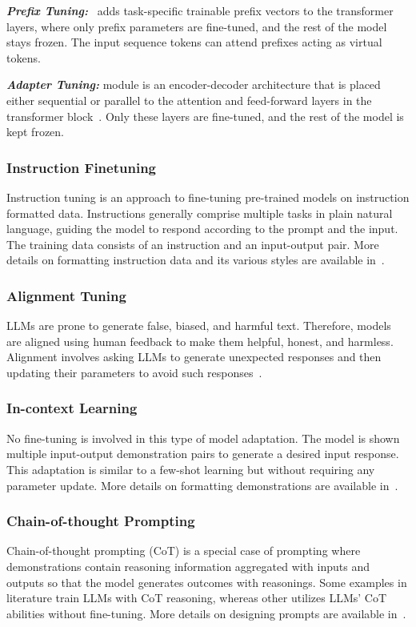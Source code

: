 \vspace{1mm}
\noindent
\emph{\textbf{Prefix Tuning:}}~\cite{Prefix_Tuning} adds task-specific trainable prefix vectors to the transformer layers, where only prefix parameters are fine-tuned, and the rest of the model stays frozen. The input sequence tokens can attend prefixes acting as virtual tokens.    

\vspace{1mm}
\noindent
\emph{\textbf{Adapter Tuning:}} module is an encoder-decoder architecture that is placed either sequential or parallel to the attention and feed-forward layers in the transformer block~\cite{LMAdapter, LMAdapter_2, LMAdapter_3}. Only these layers are fine-tuned, and the rest of the model is kept frozen.  

\subsubsection{Instruction Finetuning}
Instruction tuning is an approach to fine-tuning pre-trained models on instruction formatted data. Instructions generally comprise multiple tasks in plain natural language, guiding the model to respond according to the prompt and the input. The training data consists of an instruction and an input-output pair. More details on formatting instruction data and its various styles are available in~\cite{Survey_LLM}.     

\subsubsection{Alignment Tuning}
LLMs are prone to generate false, biased, and harmful text. Therefore, models are aligned using human feedback to make them helpful, honest, and harmless. Alignment involves asking LLMs to generate unexpected responses and then updating their parameters to avoid such responses~\cite{Survey_LLM}.

\subsubsection{In-context Learning} 
No fine-tuning is involved in this type of model adaptation. The model is shown multiple input-output demonstration pairs to generate a desired input response. This adaptation is similar to a few-shot learning but without requiring any parameter update. More details on formatting demonstrations are available in~\cite{Survey_LLM}. 
 
\subsubsection{Chain-of-thought Prompting}
Chain-of-thought prompting (CoT) is a special case of prompting where demonstrations contain reasoning information aggregated with inputs and outputs so that the model generates outcomes with reasonings. Some examples in literature train LLMs with CoT reasoning, whereas other utilizes LLMs' CoT abilities without fine-tuning. More details on designing prompts are available in~\cite{Survey_LLM}.

